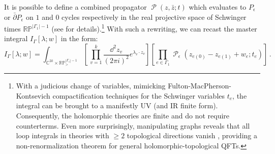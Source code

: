 \documentclass[11pt]{article}
\DeclareMathOperator{\calP}{\mathcal{P}}
\def\bbR{\mathbb{R}}
\def\bbC{\mathbb{C}}
\begin{document}
It is possible to define a combined propagator $\calP(z,\bar{z};t)$ which evaluates to $P_\epsilon$ or $\bar\partial P_\epsilon$ on $1$ and $0$ cycles respectively in the real projective space of Schwinger times $\mathbb{RP}^{|\Gamma_1|-1}$ (see \cite{Budzik:2022mpd, Gaiotto:2024gii} for details).\footnote{With a judicious change of variables, mimicking Fulton-MacPherson-Kontsevich compactification techniques for the Schwinger variables $t_e$, the integral can be brought to a manifestly UV (and IR finite form). Consequently, the holomorphic theories are finite and do not require counterterms. Even more surprisingly, manipulating graphs reveals that all loop integrals in theories with $\geq \! 2$ topological directions vanish \cite{Gaiotto:2024gii, Balduf:2024wwp}, providing a non-renormalization theorem for general holomorphic-topological QFTs.} With such a rewriting, we can recast the master integral $I_{\Gamma}[\lambda;w]$ in the form:
\begin{equation}\label{eq:MasterIntegral}
    I_\Gamma[\lambda;w] 
        = \int_{\bbC^{2k} \times \bbR \mathbb{P}_>^{|\Gamma_1|-1}} 
        \left[\,\prod^{k}_{v=1} \frac{\dd^2 z_v}{(2\pi i)^2} e^{\lambda_v \cdot z_v}\right] \left[\prod_{e \in \Gamma_1} \calP_{\epsilon}(z_{e(0)}-z_{e(1)}+w_e;t_e) \right]\,.
\end{equation}
\end{document}
